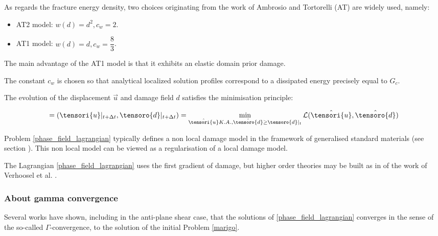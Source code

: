 As regards the fracture energy density, two choices originating from the
work of Ambrosio and Tortorelli (AT) are widely used, namely:
\begin{itemize}
    \item AT2 model: $w(d) = d^2, c_w=2$.
    \item AT1 model: $w(d) = d, c_w=\dfrac{8}{3}$.
\end{itemize}

The main advantage of the AT1 model is that it exhibits an elastic domain prior damage.

The constant $c_w$ is chosen so that analytical localized solution
profiles correspond to a dissipated energy precisely equal to $G_c$.

The evolution of the displacement $\vec{u}$ and damage field $d$
satisfies the minimisation principle:

\begin{equation}
    \label{phase_field_lagrangian}
    =
    (\tensori{u}\vert_{t + \Delta t}, \tensoro{d}\vert_{t + \Delta t})
    =
    \min_{\hat{\tensori{u}} K.A., \hat{\tensoro{d}} \geq \tensoro{d}\vert_{t}}
    \mathcal{L}(\hat{\tensori{u}}, \hat{\tensoro{d}})
\end{equation}

Problem \eqref{phase_field_lagrangian} typically defines a non local damage
model in the framework of generalised standard materials (see section
). This non local
model can be viewed as a regularisation of a local damage model.

The Lagrangian \eqref{phase_field_lagrangian} uses the first
gradient of damage, but higher order theories may be built as in of the
work of Verhoosel et al. \cite{verhoosel_isogeometric_2011}.

\subsubsection{About gamma convergence}

Several works have shown, including \cite{2000_BOURDIN_FRACNFORT_MARIGO_NumericalExperimentsInRevisitedBrittleFracture} in the
anti-plane shear case, that the solutions of \eqref{phase_field_lagrangian}
converges in the sense of the so-called $\Gamma$-convergence, to the
solution of the initial Problem \eqref{marigo}.

